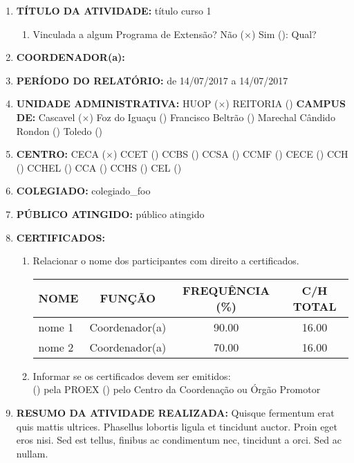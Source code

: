 \documentclass[12pt,a4paper,oneside]{article}%
\begin{document}
\begin{enumerate}%
\footnotesize%
\item%
\textbf{TÍTULO DA ATIVIDADE: }%
título curso 1%
\begin{enumerate}%
\item%
Vinculada a algum Programa de Extensão? %
Não ($\times$) Sim (): Qual? %
\end{enumerate}%
\item%
\textbf{COORDENADOR(a): }%
\item%
\textbf{PERÍODO DO RELATÓRIO: }%
de 14/07/2017 a 14/07/2017%
\item%
\textbf{UNIDADE ADMINISTRATIVA: }%
HUOP ($\times$) %
REITORIA () %
\newline%
\textbf{CAMPUS DE: }%
Cascavel ($\times$) %
Foz do Iguaçu () %
Francisco Beltrão () %
Marechal Cândido Rondon () %
Toledo () %
\item%
\textbf{CENTRO: }%
\newline%
CECA ($\times$) %
CCET () %
CCBS () %
CCSA () %
CCMF () %
CECE () %
CCH () %
CCHEL () %
CCA () %
CCHS () %
CEL () %
\item%
\textbf{COLEGIADO: }%
colegiado\_foo%
\item%
\textbf{PÚBLICO ATINGIDO: }%
público atingido%
\item%
\textbf{CERTIFICADOS: }%
\begin{enumerate}%
\item%
Relacionar o nome dos participantes com direito a certificados.%
\newline%
\begin{tabularx}{\linewidth}{|>{\centering\arraybackslash}X|
                              @{    }c@{    }|
                              @{    }c@{    }|
                              @{    }c@{    }|
                              }%
\hline%
NOME&FUNÇÃO&FREQUÊNCIA (\%)&C/H TOTAL\\%
\hline%
nome 1&Coordenador(a)&90.00&16.00\\%
\hline%
nome 2&Coordenador(a)&70.00&16.00\\%
\hline%
\end{tabularx}%
\linebreak%
\item%
Informar se os certificados devem ser emitidos: \\%
() pela PROEX \hfill () pelo Centro da Coordenação ou Órgão Promotor%
\end{enumerate}%
\item%
\textbf{RESUMO DA ATIVIDADE REALIZADA: }%
Quisque fermentum erat quis mattis ultrices. Phasellus lobortis ligula et tincidunt auctor. Proin eget eros nisi. Sed est tellus, finibus ac condimentum nec, tincidunt a orci. Sed ac nullam.%

\end{enumerate}
\end{document}
